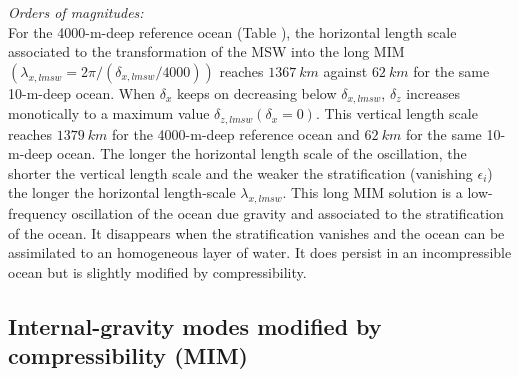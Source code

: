 \documentclass[a4paper,11pt]{article}
\begin{document}
\textit{Orders of magnitudes:}\\
For the 4000-m-deep reference ocean (Table ), the horizontal length scale associated to the transformation of the MSW into the long MIM $(\lambda_{x,lmsw}=2\pi/(\delta_{x,lmsw}/4000))$ reaches $1367\ km$ against $62\ km$ for the same 10-m-deep ocean. When $\delta_x$ keeps on decreasing below $\delta_{x,lmsw}$, $\delta_z$ increases monotically to a maximum value $\delta_{z,lmsw}(\delta_x=0)$. This vertical length scale reaches $1379\ km$ for the 4000-m-deep reference ocean and $62\ km$ for the same 10-m-deep ocean. The longer the horizontal length scale of the oscillation, the shorter the vertical length scale and the weaker the stratification (vanishing $\epsilon_i$) the longer the horizontal length-scale $\lambda_{x,lmsw}$. This long MIM solution is a low-frequency oscillation of the ocean due gravity and associated to the stratification of the ocean. It disappears when the stratification vanishes and the ocean can be assimilated to an homogeneous layer of water. It does persist in an incompressible ocean but is slightly modified by compressibility.


%
\subsection{Internal-gravity modes modified by compressibility (MIM)}
\label{SubSectionGraphicMIW}
\end{document}
